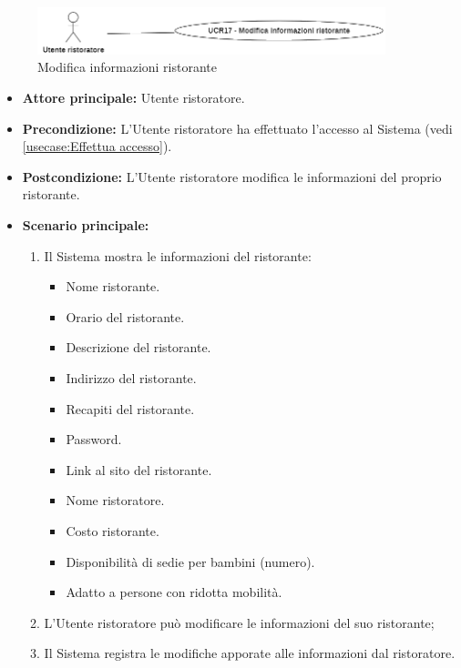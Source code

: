 \label{usecase:Modifica informazioni ristorante}

\begin{figure}[h]
	\centering
	\includegraphics[width=0.9\textwidth]{./uml/UCR17.png} 
	\caption{Modifica informazioni ristorante}
	\label{fig:UCR17}
  \end{figure}

\begin{itemize}
	\item \textbf{Attore principale:} Utente ristoratore.

	\item \textbf{Precondizione:} L'Utente ristoratore ha effettuato l'accesso al Sistema (vedi \autoref{usecase:Effettua accesso}).

	\item \textbf{Postcondizione:} L'Utente ristoratore modifica le informazioni del proprio ristorante.


	\item \textbf{Scenario principale:}
	      \begin{enumerate}

		      \item Il Sistema mostra le informazioni del ristorante:
		      \begin{itemize}
                \item Nome ristorante.
                \item Orario del ristorante.
                \item Descrizione del ristorante.
                \item Indirizzo del ristorante.
                \item Recapiti del ristorante.
                \item Password. 
                \item Link al sito del ristorante.
                \item Nome ristoratore.
                \item Costo ristorante.
                \item Disponibilità di sedie per bambini (numero).
                \item Adatto a persone con ridotta mobilità.
              \end{itemize}

		      \item L'Utente ristoratore può modificare le informazioni del suo ristorante;
		      \item Il Sistema registra le modifiche apporate alle informazioni dal ristoratore.

	      \end{enumerate}
\end{itemize}
